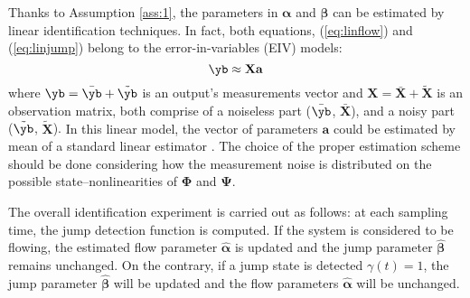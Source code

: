 Thanks to Assumption \ref{ass:1}, the parameters in $\bm{\alpha}$ and $\bm{\beta}$ can be estimated by linear identification techniques. In fact, both equations,  (\ref{eq:linflow}) and (\ref{eq:linjump}) belong to the error-in-variables (EIV) models:
\begin{equation}
	\yb\approx \mathbf{Xa}
\end{equation}
where $\yb = \bar{\yb}+\tilde{\yb}$ is an output's measurements vector and $\mathbf{X} = \bar{\mathbf{X}}+\tilde{\mathbf{X}}$ is an observation matrix, both comprise of a noiseless part ($\bar{\yb}$, $\bar{\mathbf{X}}$), and  a noisy part ($\tilde{\yb}$, $\tilde{\mathbf{X}}$).
%
{%
In this linear model, the vector of parameters $\mathbf{a}$ could be estimated by mean of a standard linear estimator \cite{ljung1987system}. The choice of the proper estimation scheme should be done considering how the measurement noise is distributed on the possible state--nonlinearities of $\bm{\Phi}$ and $\bm{\Psi}$.
}%

The overall identification experiment is carried out as follows: at each sampling time, the jump detection function is computed. If the system is considered to be flowing, the estimated flow parameter $\hat{\bm{\alpha}}$ is updated and the jump parameter $\hat{\bm{\beta}}$ remains unchanged. On the contrary, if a jump state is detected  $\gamma(t)=1$, the jump parameter $\hat{\bm{\beta}}$ will be updated and the flow parameters $\hat{\bm{\alpha}}$ will be unchanged.

